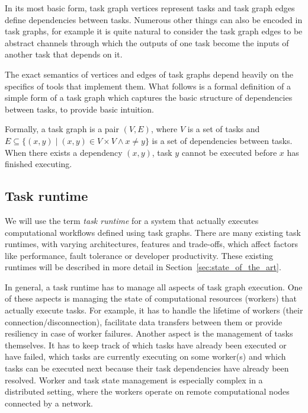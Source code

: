 In its most basic form, task graph vertices represent tasks and task graph
edges define dependencies between tasks. Numerous other things can also be encoded in task graphs,
for example it is quite natural to consider the task graph edges to be abstract channels through
which the outputs of one task become the inputs of another task that depends on it.

The exact semantics of vertices and edges of task graphs depend heavily on the specifics of tools
that implement them. What follows is a formal definition of a simple form of a task graph which
captures the basic structure of dependencies between tasks, to provide basic intuition.

Formally, a task graph is a pair $(V, E)$, where $V$ is a set of tasks and
$E \subseteq \{(x, y) \mid (x, y) \in V\times{}V \land x \neq y \}$ is a set of dependencies
between tasks. When there exists a dependency $(x, y)$, task $y$ cannot be executed before $x$ has
finished executing.



\subsection{Task runtime}
We will use the term \emph{task runtime} for a system that actually executes
computational workflows defined using task graphs. There are many existing task runtimes,
with varying architectures, features and trade-offs, which affect factors like performance, fault
tolerance or developer productivity. These existing runtimes will be described in more detail
in Section~\ref{sec:state_of_the_art}.

In general, a task runtime has to manage all aspects of task graph execution.
One of these aspects is managing the state of computational resources (workers) that actually
execute tasks. For example, it has to handle the lifetime of workers (their
connection/disconnection), facilitate data transfers between them or provide resiliency in case of
worker failures. Another aspect is the management of tasks themselves. It has to keep track of
which tasks have already been executed or have failed, which tasks are currently executing on some
worker(s) and which tasks can be executed next because their task dependencies have already been
resolved. Worker and task state management is especially complex in a distributed setting, where
the workers operate on remote computational nodes connected by a network.

